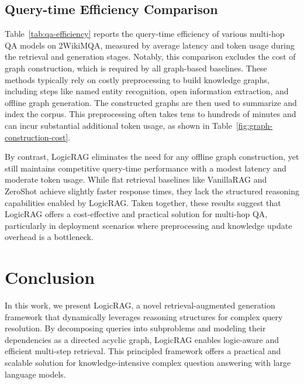 \documentclass[letterpaper]{article} %
\newcommand{\shengyuan}[1]{\todo[inline,size=\footnotesize,color=red!20]{\textbf{shengyuan}: #1}}
\begin{document}
\subsection{Query-time Efficiency Comparison}

Table~\ref{tab:qa-efficiency} reports the query-time efficiency of various multi-hop QA models on 2WikiMQA, measured by average latency and token usage during the retrieval and generation stages. Notably, this comparison excludes the cost of graph construction, which is required by all graph-based baselines. These methods typically rely on costly preprocessing to build knowledge graphs, including steps like named entity recognition, open information extraction, and offline graph generation. The constructed graphs are then used to summarize and index the corpus. This preprocessing often takes tens to hundreds of minutes and can incur substantial additional token usage, as shown in Table~\ref{fig:graph-construction-cost}.


By contrast, LogicRAG eliminates the need for any offline graph construction, yet still maintains competitive query-time performance with a modest latency and moderate token usage. While flat retrieval baselines like VanillaRAG and ZeroShot achieve slightly faster response times, they lack the structured reasoning capabilities enabled by LogicRAG. Taken together, these results suggest that LogicRAG offers a cost-effective and practical solution for multi-hop QA, particularly in deployment scenarios where preprocessing and knowledge update overhead is a bottleneck.


\section{Conclusion}

In this work, we present LogicRAG, a novel retrieval-augmented generation framework that dynamically leverages reasoning structures for complex query resolution. By decomposing queries into subproblems and modeling their dependencies as a directed acyclic graph, LogicRAG enables logic-aware and efficient multi-step retrieval. 
This principled framework offers a practical and scalable solution for knowledge-intensive complex question answering with large language models.
\end{document}
